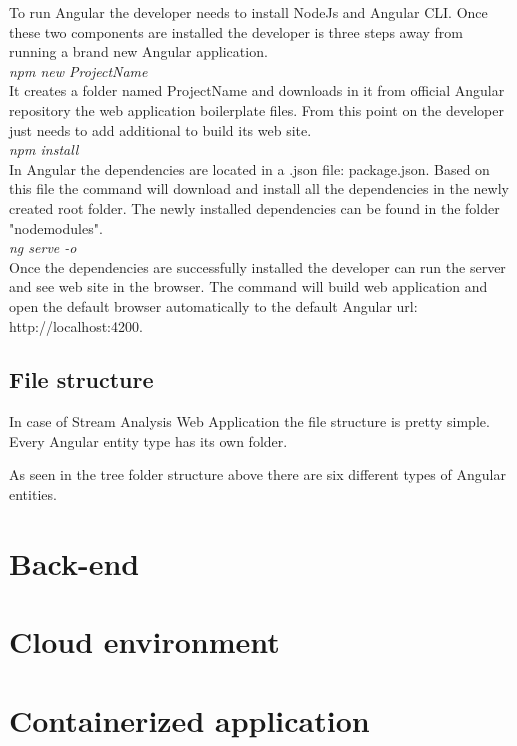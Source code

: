 To run Angular the developer needs to install NodeJs and Angular CLI. Once these two components are installed the developer is three steps away from running a brand new Angular application.\\

\textit{npm new ProjectName}\\

It creates a folder named ProjectName and downloads in it from official Angular repository the web application boilerplate files. From this point on the developer just needs to add additional to build its web site.\\

\textit{npm install}\\

In Angular the dependencies are located in a .json file: package.json. Based on this file the command will download and install all the dependencies in the newly created root folder. The newly installed dependencies can be found in the folder "nodemodules".\\

\textit{ng serve -o}\\

Once the dependencies are successfully installed the developer can run the server and see web site in the browser. The command will build web application and open the default browser automatically to the default Angular url: http://localhost:4200.\\

\subsection{File structure}
\label{chap:04:01:02}

In case of Stream Analysis Web Application the file structure is pretty simple. Every Angular entity type has its own folder.\\


As seen in the tree folder structure above there are six different types of Angular entities.

\section{Back-end}
\label{chap:04:02}

\section{Cloud environment}
\label{chap:04:03}

\section{Containerized application}
\label{chap:04:04}